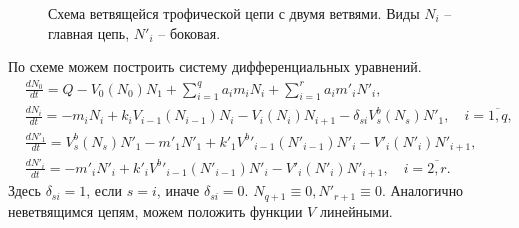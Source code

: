 \begin{figure}[H]
    \caption{Схема ветвящейся трофической цепи с двумя ветвями. Виды \(N_i\) -- главная цепь, \(N'_i\) -- боковая.} \label{shema2}
\end{figure}

По схеме можем построить систему дифференциальных уравнений.
\begin{equation} \label{double_full}
    \begin{split}
        & \frac{d N_0}{dt} = Q - V_0(N_0) N_1 + \sum_{i=1}^q a_i m_i N_i + \sum_{i=1}^r a_i m'_i N'_i, \\
        & \frac{d N_i}{dt} = -m_i N_i + k_i V_{i-1}(N_{i-1}) N_i - V_i(N_i) N_{i+1} - \delta_{si} V_s^b(N_s) N'_1, \quad i=\overline{1,q}, \\
        & \frac{d N'_1}{dt} = V_s^b(N_s) N'_1 -m'_1 N'_1 + k'_1 {V^b}'_{i-1}(N'_{i-1}) N'_i - V'_i(N'_i) N'_{i+1}, \\
        & \frac{d N'_i}{dt} = -m'_i N'_i + k'_i {V^b}'_{i-1}(N'_{i-1}) N'_i - V'_i(N'_i) N'_{i+1}, \quad i=\overline{2,r}.
    \end{split}
\end{equation} 
Здесь \( \delta_{si} = 1\), если \(s = i\), иначе \(\delta_{si} = 0\). \(N_{q+1} \equiv 0, N'_{r+1} \equiv 0\). Аналогично неветвящимся цепям, можем положить функции \(V\) линейными. 
